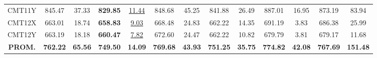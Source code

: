 \begin{table}[h]
\begin{tabular}{|c||c c|c c|c c|c c|c c|c c|}
CMT11Y & 845.47 & 37.33 & \textbf{829.85} & \underline{11.44} & 848.68 & 45.25 & 841.88 & 26.49 & 887.01 & 16.95 & 873.19 & 83.94\\
CMT12X & 663.01 & 18.74 & \textbf{658.83} & \underline{9.03} & 668.48 & 24.83 & 662.22 & 14.35 & 691.19 & 3.83 & 686.38 & 25.99\\
CMT12Y & 663.19 & 18.18 & \textbf{660.47} & \underline{7.82} & 672.60 & 24.47 & 662.22 & 10.82 & 679.79 & 3.81 & 679.17 & 11.68\\
\hline\hline
\textbf{PROM.} & \textbf{762.22} & \textbf{65.56} & \textbf{749.50} & \textbf{14.09} & \textbf{769.68} & \textbf{43.93} & \textbf{751.25} & \textbf{35.75} & \textbf{774.82} & \textbf{42.08} & \textbf{767.69} & \textbf{151.48} \\[1ex]\hline
\end{tabular}
\label{tabla-final-comparativaS}
\end{table}
